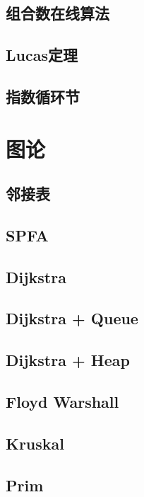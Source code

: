 \documentclass[a4paper, 12pt, twoside]{article}
\begin{document}
\subsection{组合数在线算法}

\subsection{Lucas定理}

\subsection{指数循环节}


\section{图论}
\subsection{邻接表}

\subsection{SPFA}

\subsection{Dijkstra}

\subsection{Dijkstra + Queue}

\subsection{Dijkstra + Heap}

\subsection{Floyd Warshall}

\subsection{Kruskal}

\subsection{Prim}

\end{document}
